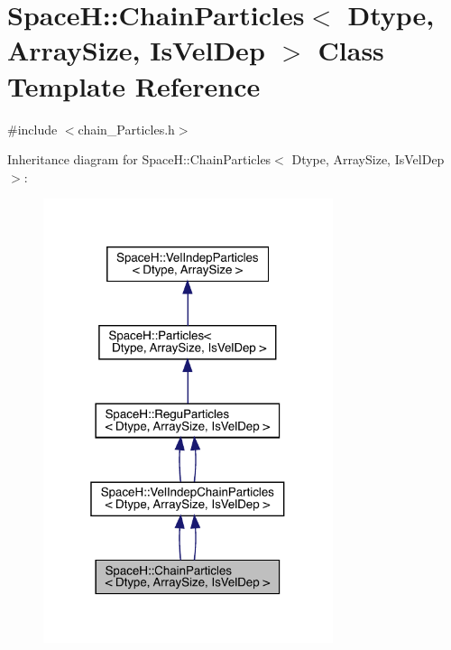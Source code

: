 \hypertarget{class_space_h_1_1_chain_particles}{}\section{SpaceH\+:\+:Chain\+Particles$<$ Dtype, Array\+Size, Is\+Vel\+Dep $>$ Class Template Reference}
\label{class_space_h_1_1_chain_particles}


{\ttfamily \#include $<$chain_\+Particles.\+h$>$}



Inheritance diagram for SpaceH\+:\+:Chain\+Particles$<$ Dtype, Array\+Size, Is\+Vel\+Dep $>$\+:
\nopagebreak
\begin{figure}[H]
\begin{center}
\leavevmode
\includegraphics[width=241pt]{class_space_h_1_1_chain_particles__inherit__graph}
\end{center}
\end{figure}


